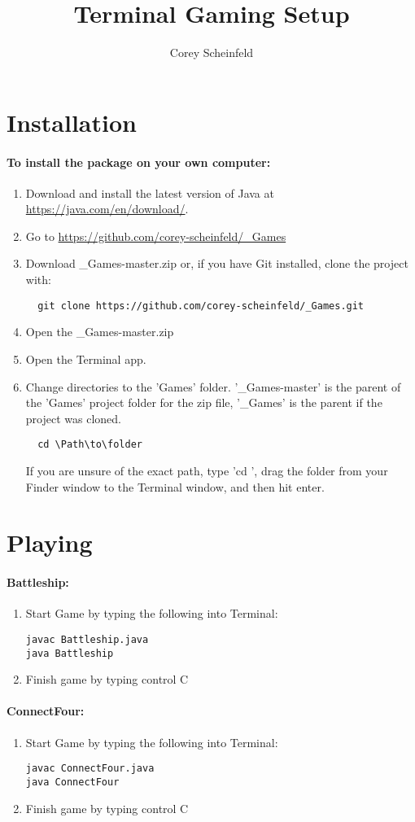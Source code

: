 \documentclass{article}
\title{Terminal Gaming Setup}
\author{Corey Scheinfeld}
\begin{document}
	\maketitle
	\newpage

	\section{Installation}
		\paragraph{To install the package on your own computer:}
			\begin{enumerate}
				\item Download and install the latest version of Java at \url{https://java.com/en/download/}.
				\item Go to \url{https://github.com/corey-scheinfeld/_Games}
				\item Download _Games-master.zip or, if you have Git installed, clone the project with:
					\begin{lstlisting}
  git clone https://github.com/corey-scheinfeld/_Games.git
					\end{lstlisting}
				\item Open the _Games-master.zip
				\item Open the Terminal app.
				\item Change directories to the 'Games' folder. '_Games-master' is the parent of the 'Games' project folder for the zip file, '_Games' is the parent if the project was cloned. 
					\begin{lstlisting}
  cd \Path\to\folder
					\end{lstlisting}
					If you are unsure of the exact path, type 'cd ', drag the folder from your Finder window to the Terminal window, and then hit enter.
  		\end{enumerate}

\section{Playing}
				\paragraph{Battleship:}
					\begin{enumerate}
								\item Start Game by typing the following into Terminal:
									\begin{lstlisting}
javac Battleship.java
java Battleship
									\end{lstlisting}
								\item Finish game by typing control C

					\end{enumerate}
				\paragraph{ConnectFour:}
					\begin{enumerate}
								\item Start Game by typing the following into Terminal:
									\begin{lstlisting}
javac ConnectFour.java
java ConnectFour
									\end{lstlisting}
								\item Finish game by typing control C

					\end{enumerate}
\end{document}
